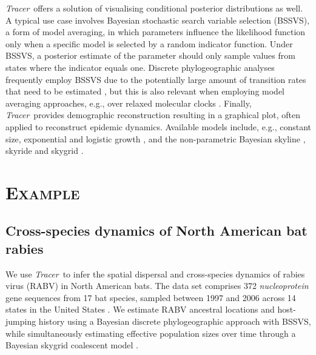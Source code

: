 \documentclass[webpdf,mynatbib,nosurname,nogrid,noCE,noMSC]{SYS}
\newcommand{\tracer}{\emph{Tracer}}
\begin{document}
\tracer\ offers a solution of visualising conditional posterior distributions as well.
A typical use case involves Bayesian stochastic search variable selection (BSSVS), a form of model averaging, in which parameters influence the likelihood function only when a specific model is selected by a random indicator function.
Under BSSVS, a posterior estimate of the parameter should only sample values from states where the indicator equals one.
Discrete phylogeographic analyses frequently employ BSSVS due to the potentially large amount of transition rates that need to be estimated \citep{Lemey2009}, but this is also relevant when employing model averaging approaches, e.g., over relaxed molecular clocks \citep{Li2012}.
%
Finally, \tracer\ provides demographic reconstruction resulting in a graphical plot, often applied to reconstruct epidemic dynamics.
Available models include, e.g., constant size, exponential and logistic growth \citep{drummond2002estimating},
and the non-parametric Bayesian skyline \citep{drummond2005bayesian,heledDrummond2008}, skyride \citep{minin2008smooth} and skygrid \citep{gill2012improving}.

\vspace{-0.7cm}

\section*{\textsc{Example}}

\subsection*{Cross-species dynamics of North American bat rabies}

We use \tracer\ to infer the spatial dispersal and cross-species dynamics of rabies virus (RABV) in North American bats.
The data set comprises 372 \textit{nucleoprotein} gene sequences from 17 bat species, sampled between 1997 and 2006 across 14 states in the United States \citep{Streicker,Faria2013}.
We estimate RABV ancestral locations and host-jumping history using a Bayesian discrete phylogeographic approach with BSSVS, while simultaneously estimating effective population sizes over time through a Bayesian skygrid coalescent model \citep{gill2012improving}.
\end{document}
